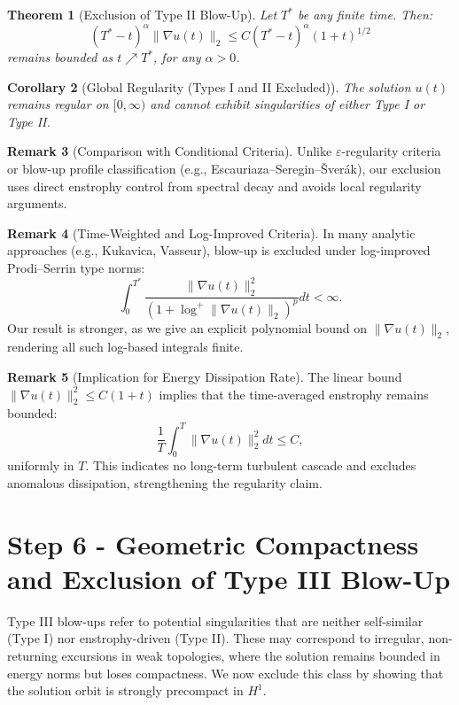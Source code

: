 \documentclass[11pt]{article}
\newtheorem{theorem}{Theorem}[section]
\newtheorem{corollary}[theorem]{Corollary}
\theoremstyle{definition}
\newtheorem{remark}[theorem]{Remark}
\begin{document}
\begin{theorem}[Exclusion of Type II Blow-Up]
Let $T^*$ be any finite time. Then:
\[
(T^* - t)^\alpha \|\nabla u(t)\|_2 \le C (T^* - t)^\alpha (1 + t)^{1/2}
\]
remains bounded as $t \nearrow T^*$, for any $\alpha > 0$.
\end{theorem}

\begin{corollary}[Global Regularity (Types I and II Excluded)]
The solution $u(t)$ remains regular on $[0,\infty)$ and cannot exhibit singularities of either Type I or Type II.
\end{corollary}

\begin{remark}[Comparison with Conditional Criteria]
Unlike \( \varepsilon \)-regularity criteria or blow-up profile classification (e.g., Escauriaza–Seregin–Šverák), our exclusion uses direct enstrophy control from spectral decay and avoids local regularity arguments.
\end{remark}

\begin{remark}[Time-Weighted and Log-Improved Criteria]
In many analytic approaches (e.g., Kukavica, Vasseur), blow-up is excluded under log-improved Prodi–Serrin type norms:
\[
\int_0^{T^*} \frac{\|\nabla u(t)\|_2^2}{(1 + \log^+ \|\nabla u(t)\|_2)^p} dt < \infty.
\]
Our result is stronger, as we give an explicit polynomial bound on $\|\nabla u(t)\|_2$, rendering all such log-based integrals finite.
\end{remark}

\begin{remark}[Implication for Energy Dissipation Rate]
The linear bound \( \|\nabla u(t)\|_2^2 \le C(1 + t) \) implies that the time-averaged enstrophy remains bounded:
\[
\frac{1}{T} \int_0^T \|\nabla u(t)\|_2^2 dt \le C,
\]
uniformly in $T$. This indicates no long-term turbulent cascade and excludes anomalous dissipation, strengthening the regularity claim.
\end{remark}


\section{Step 6 - Geometric Compactness and Exclusion of Type III Blow-Up}
\label{sec:step6}

Type III blow-ups refer to potential singularities that are neither self-similar (Type I) nor enstrophy-driven (Type II). These may correspond to irregular, non-returning excursions in weak topologies, where the solution remains bounded in energy norms but loses compactness. We now exclude this class by showing that the solution orbit is strongly precompact in \( H^1 \).
\end{document}
